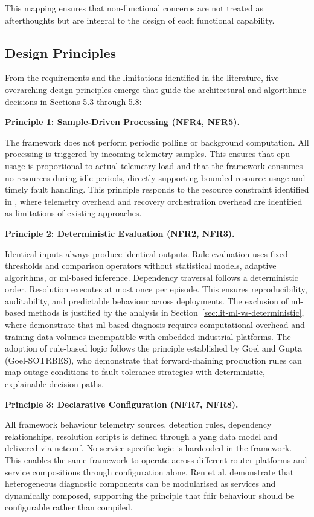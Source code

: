 This mapping ensures that non-functional concerns are not treated as afterthoughts but are integral to the design of each functional capability.

\subsection{Design Principles}\label{sec:design-principles}

From the requirements and the limitations identified in the literature, five overarching design principles emerge that guide the architectural and algorithmic decisions in Sections 5.3 through 5.8:

\textbf{Principle 1: Sample-Driven Processing (NFR4, NFR5).}

The framework does not perform periodic polling or background computation. All processing is triggered by incoming telemetry samples. This ensures that \gls{cpu} usage is proportional to actual telemetry load and that the framework consumes no resources during idle periods, directly supporting bounded resource usage and timely fault handling. This principle responds to the resource constraint identified in \cite{ref14,ref17}, where telemetry overhead and recovery orchestration overhead are identified as limitations of existing approaches.

\textbf{Principle 2: Deterministic Evaluation (NFR2, NFR3).}

Identical inputs always produce identical outputs. Rule evaluation uses fixed thresholds and comparison operators without statistical models, adaptive algorithms, or \gls{ml}-based inference. Dependency traversal follows a deterministic order. Resolution executes at most once per episode. This ensures reproducibility, auditability, and predictable behaviour across deployments. The exclusion of \gls{ml}-based methods is justified by the analysis in Section~\ref{sec:lit-ml-vs-deterministic}, where \cite{ref6,ref22,ref27,ref28} demonstrate that \gls{ml}-based diagnosis requires computational overhead and training data volumes incompatible with embedded industrial platforms. The adoption of rule-based logic follows the principle established by Goel and Gupta (Goel-SOTRBES), who demonstrate that forward-chaining production rules can map outage conditions to fault-tolerance strategies with deterministic, explainable decision paths.

\textbf{Principle 3: Declarative Configuration (NFR7, NFR8).}

All framework behaviour telemetry sources, detection rules, dependency relationships, resolution scripts is defined through a \gls{yang} data model and delivered via \gls{netconf}. No service-specific logic is hardcoded in the framework. This enables the same framework to operate across different router platforms and service compositions through configuration alone. Ren et al. \cite{ref29} demonstrate that heterogeneous diagnostic components can be modularised as services and dynamically composed, supporting the principle that \gls{fdir} behaviour should be configurable rather than compiled.

